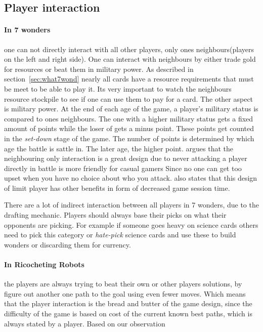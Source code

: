 \documentclass[a4paper]{article}
\begin{document}
\subsection{Player interaction}

\paragraph{In 7 wonders} one can not directly interact with all other players, only ones neighbours(players on the left and right side). One can interact with neighbours by either trade gold for resources or beat them in military power. As described in section~\ref{sec:what7wond} nearly all cards have a resource requirements that must be meet to be able to play it. Its very important to watch the neighbours resource stockpile to see if one can use them to pay for a card. The other aspect is military power. At the end of each age of the game, a player's military status is compared to ones neighbours. The one with a higher military status gets a fixed amount of points while the loser of gets a minus point. These points get counted in the \textit{set-down} stage of the game. The number of points is determined by which age the battle is sattle in. The later age, the higher point. 
 argues that the neighbouring only interaction is a great design due to never attacking a player directly in battle is more friendly for casual gamers Since no one can get too upset when you have no choice about who you attack. \citeauthor{notsacgame7wond} also states that this design of limit player has other benefits in form of decreased game session time. 

There are a lot of indirect interaction between all players in 7 wonders, due to the drafting mechanic. Players should always base their picks on what their opponents are picking. For example if someone goes heavy on science cards others need to pick this category or \textit{hate-pick} science cards and use these to build wonders or discarding them for currency.

\paragraph{In Ricocheting Robots} the players are always trying to beat their own or other players solutions, by figure out another one path to the goal using even fewer moves. Which means that the player interaction is the bread and butter of the game design, since the difficulty of the game is based on cost of the current known best paths, which is always stated by a player. Based on our observation
\end{document}
